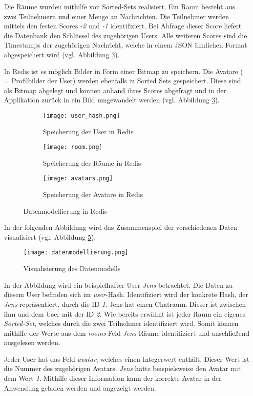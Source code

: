 Die Räume wurden mithilfe von Sorted-Sets realisiert. Ein Raum besteht aus zwei Teilnehmern und einer Menge an Nachrichten. Die Teilnehmer werden mittels den festen Scores \textit{-2} und \textit{-1} identifiziert. Bei Abfrage dieser Score liefert die Datenbank den Schlüssel des zugehörigen Users. Alle weiteren Scores sind die Timestamps der zugehörigen Nachricht, welche in einem \acs{JSON} ähnlichen Format abgespeichert wird (vgl. Abbildung \ref{fig:sub3}).

In \acs{Redis} ist es möglich Bilder in Form einer Bitmap zu speichern. Die Avatare ( = Profilbilder der User) werden ebenfalls in Sorted Sets gespeichert. Diese sind als Bitmap abgelegt und können anhand ihres Scores abgefragt und in der Applikation zurück in ein Bild umgewandelt werden (vgl. Abbildung \ref{fig:sub3}).
\begin{figure}[h]
	\centering
	
	\begin{subfigure}{0.3\textwidth}
		\centering
		\texttt{[image: user\_hash.png]}
		\caption{Speicherung der User in \acs{Redis}}
		\label{fig:sub1}
	\end{subfigure}%
	\hspace{0.02\textwidth}
	\begin{subfigure}{0.3\textwidth}
		\centering
		\texttt{[image: room.png]}
		\caption{Speicherung der Räume in \acs{Redis}}
		\label{fig:sub2}
	\end{subfigure}%
	\hspace{0.02\textwidth}
	\begin{subfigure}{0.3\textwidth}
		\centering
		\texttt{[image: avatars.png]}
		\caption{Speicherung der Avatare in \acs{Redis}}
		\label{fig:sub3}
	\end{subfigure}
	
	\caption{Datenmodellierung in \acs{Redis}}
	\label{fig:overall}
\end{figure}

In der folgenden Abbildung wird das Zusammenspiel der verschiedenen Daten visualisiert (vgl. Abbildung \ref{fig:datenmodell}). 
\begin{figure}[h]
	\centering
	\texttt{[image: datenmodellierung.png]}
	\caption{Visualisierung des Datenmodells}
	\label{fig:datenmodell}
\end{figure}

In der Abbildung wird ein beispielhafter User \textit{Jens} betrachtet. Die Daten zu diesem User befinden sich im \textit{user}-Hash. Identifiziert wird der konkrete Hash, der \textit{Jens} repräsentiert, durch die ID \textit{1}. Jens hat einen Chatraum. Dieser ist zwischen ihm und dem User mit der ID \textit{2}. Wie bereits erwähnt ist jeder Raum ein eigenes \textit{Sorted-Set}, welches durch die zwei Teilnehmer identifiziert wird. Somit können mithilfe der Werte aus dem \textit{rooms} Feld \textit{Jens} Räume identifiziert und anschließend ausgelesen werden.

Jeder User hat das Feld \textit{avatar}, welches einen Integerwert enthält. Dieser Wert ist die Nummer des zugehörigen Avatars. \textit{Jens} hätte beispielsweise den Avatar mit dem Wert \textit{1}. Mithilfe dieser Information kann der korrekte Avatar in der Anwendung geladen werden und angezeigt werden.
